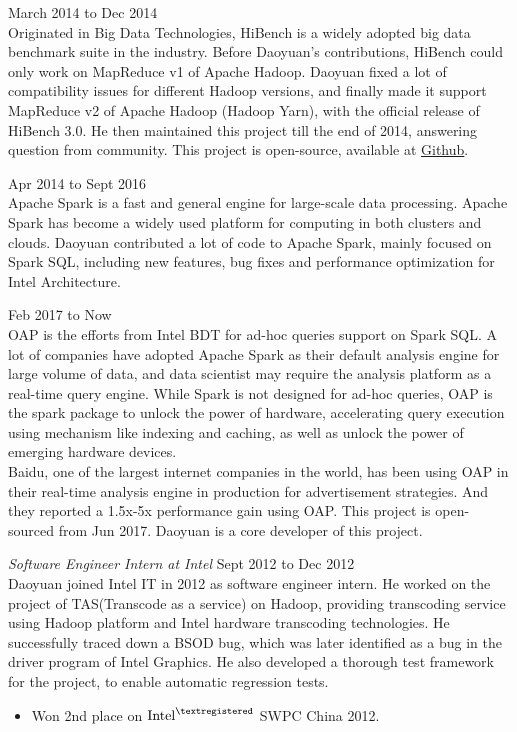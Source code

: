 \documentclass[line,margin]{res}
\begin{document}
\begin{resume}
\begin{outline}
              \hfill        March 2014 to Dec 2014\\
                Originated in Big Data Technologies, HiBench is a widely adopted big data benchmark suite in the industry. Before Daoyuan's contributions, HiBench could only work on MapReduce v1 of Apache Hadoop. Daoyuan fixed a lot of compatibility issues for different Hadoop versions, and finally made it support MapReduce v2 of Apache Hadoop (Hadoop Yarn), with the official release of HiBench 3.0. He then maintained this project till the end of 2014, answering question from community. This project is open-source, available at \href{https://github.com/intel-hadoop/HiBench}{Github}.
                   
             \hfill        Apr 2014 to Sept 2016 \\
                Apache Spark is a fast and general engine for large-scale data processing. Apache Spark has become a widely used platform for computing in both clusters and clouds. Daoyuan contributed a lot of code to Apache Spark, mainly focused on Spark SQL, including new features, bug fixes and performance optimization for Intel Architecture.
                   
              \hfill        Feb 2017 to Now\\
                OAP is the efforts from Intel BDT for ad-hoc queries support on Spark SQL. A lot of companies have adopted Apache Spark as their default analysis engine for large volume of data, and data scientist may require the analysis platform as a real-time query engine. While Spark is not designed for ad-hoc queries, OAP is the spark package to unlock the power of hardware, accelerating query execution using mechanism like indexing and caching, as well as unlock the power of emerging hardware devices. \\
                Baidu, one of the largest internet companies in the world, has been using OAP in their real-time analysis engine in production for advertisement strategies. And they reported a 1.5x-5x performance gain using OAP.
                This project is open-sourced from Jun 2017. Daoyuan is a core developer of this project.
        \end{outline}

      {\sl Software Engineer Intern at Intel} \hfill         Sept 2012 to Dec 2012\\
             Daoyuan joined Intel IT in 2012 as software engineer intern. He worked on the project of TAS(Transcode as a service) on Hadoop, providing transcoding service using Hadoop platform and Intel hardware transcoding technologies. He successfully traced down a BSOD bug, which was later identified as a bug in the driver program of Intel Graphics. He also developed a thorough test framework for the project, to enable automatic regression tests.
                  \begin{itemize}
                   \item Won 2nd place on $\textrm{Intel}^{\textregistered}$ SWPC China 2012.
                   \end{itemize}


\end{resume}
\end{document}

